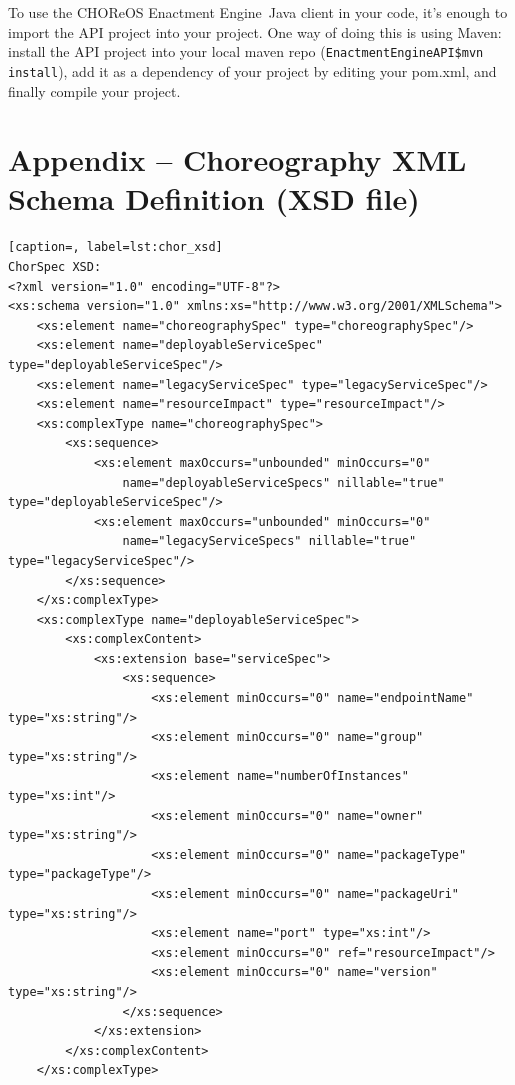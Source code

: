 \documentclass[a4paper, 10pt]{article}
\newcommand{\ee}{CHOReOS Enactment Engine}
\begin{document}
To use the \ee\ Java client in your code, it's enough to import the API project into your project. One way of doing this is using Maven: install the API project into your local maven repo (\texttt{EnactmentEngineAPI\$mvn install}), add it as a dependency of your project by editing your pom.xml, and finally compile your project.

\section*{Appendix -- Choreography XML Schema Definition (XSD file)}

{\footnotesize

\lstset{language=XML}

\begin{lstlisting}[caption=, label=lst:chor_xsd]
ChorSpec XSD:
<?xml version="1.0" encoding="UTF-8"?>
<xs:schema version="1.0" xmlns:xs="http://www.w3.org/2001/XMLSchema">
    <xs:element name="choreographySpec" type="choreographySpec"/>
    <xs:element name="deployableServiceSpec" type="deployableServiceSpec"/>
    <xs:element name="legacyServiceSpec" type="legacyServiceSpec"/>
    <xs:element name="resourceImpact" type="resourceImpact"/>
    <xs:complexType name="choreographySpec">
        <xs:sequence>
            <xs:element maxOccurs="unbounded" minOccurs="0"
                name="deployableServiceSpecs" nillable="true" type="deployableServiceSpec"/>
            <xs:element maxOccurs="unbounded" minOccurs="0"
                name="legacyServiceSpecs" nillable="true" type="legacyServiceSpec"/>
        </xs:sequence>
    </xs:complexType>
    <xs:complexType name="deployableServiceSpec">
        <xs:complexContent>
            <xs:extension base="serviceSpec">
                <xs:sequence>
                    <xs:element minOccurs="0" name="endpointName" type="xs:string"/>
                    <xs:element minOccurs="0" name="group" type="xs:string"/>
                    <xs:element name="numberOfInstances" type="xs:int"/>
                    <xs:element minOccurs="0" name="owner" type="xs:string"/>
                    <xs:element minOccurs="0" name="packageType" type="packageType"/>
                    <xs:element minOccurs="0" name="packageUri" type="xs:string"/>
                    <xs:element name="port" type="xs:int"/>
                    <xs:element minOccurs="0" ref="resourceImpact"/>
                    <xs:element minOccurs="0" name="version" type="xs:string"/>
                </xs:sequence>
            </xs:extension>
        </xs:complexContent>
    </xs:complexType>

\end{lstlisting}}
\end{document}
